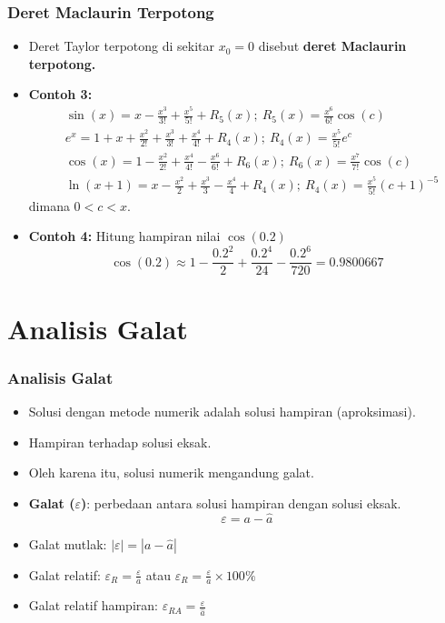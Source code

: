 \documentclass[pdflatex,compress]{beamer}
\begin{document}
\begin{frame}
	\frametitle{Deret Maclaurin Terpotong}
	\begin{itemize}
		\item Deret Taylor terpotong di sekitar $ x_0 = 0 $ disebut \textbf{deret Maclaurin terpotong.}
		\item \textbf{Contoh 3:}
		\begin{align*}
			&\sin(x) = x - \frac{x^3}{3!} + \frac{x^5}{5!} + R_5(x);~ R_5(x) = \frac{x^6}{6!}\cos(c) \\
			&e^x = 1 + x + \frac{x^2}{2!} + \frac{x^3}{3!} + \frac{x^4}{4!} + R_4(x);~R_4(x) = \frac{x^5}{5!}e^c \\
			&\cos(x) = 1 - \frac{x^2}{2!} + \frac{x^4}{4!} - \frac{x^6}{6!} + R_6(x);~R_6(x) = \frac{x^7}{7!}\cos(c) \\
			&\ln(x+1) = x - \frac{x^2}{2} + \frac{x^3}{3} - \frac{x^4}{4} + R_4(x);~R_4(x) = \frac{x^5}{5!}(c+1)^{-5}
		\end{align*}
		dimana $ 0 < c < x $.
	\end{itemize}
\end{frame}

\begin{frame}
	\begin{itemize}
		\item \textbf{Contoh 4:} Hitung hampiran nilai $ \cos(0.2) $
		\[ \cos(0.2) \approx 1 - \frac{0.2^2}{2} + \frac{0.2^4}{24} - \frac{0.2^6}{720} = 0.9800667 \]
	\end{itemize}
\end{frame}

\section{Analisis Galat}

\begin{frame}
	\frametitle{Analisis Galat}
	\begin{itemize}
		\item Solusi dengan metode numerik adalah solusi hampiran (aproksimasi).
		\item Hampiran terhadap solusi eksak.
		\item Oleh karena itu, solusi numerik mengandung galat.
		\item \textbf{Galat ($\varepsilon$)}: perbedaan antara solusi hampiran dengan solusi eksak. \[ \varepsilon = a - \hat{a} \]
		\item Galat mutlak: $|\varepsilon| = | a - \hat{a} |$
		\item Galat relatif: $ \varepsilon_R = \frac{\varepsilon}{a} $ atau $\varepsilon_R = \frac{\varepsilon}{a}\times 100\%$
		\item Galat relatif hampiran: $\varepsilon_{RA} = \frac{\varepsilon}{\hat{a}}$
	\end{itemize}
\end{frame}
\end{document}
